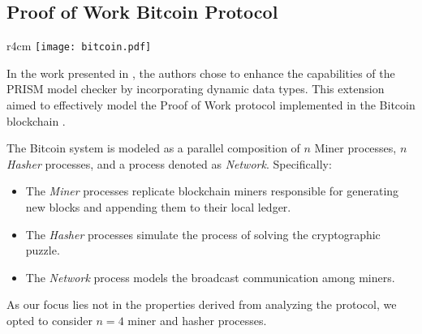 \subsection{Proof of Work Bitcoin Protocol}
\begin{wrapfigure}[11]{r}{4cm}
	\texttt{[image: bitcoin.pdf]}	
\end{wrapfigure} 
In the work presented in \cite{DBLP:journals/concurrency/BistarelliNGLMV23}, the authors chose to enhance the capabilities of the PRISM model checker by incorporating dynamic data types. This extension aimed to effectively model the Proof of Work protocol implemented in the Bitcoin blockchain \cite{bitcoin}.

The Bitcoin system is modeled as a parallel composition of $n$ Miner processes, $n$ \emph{Hasher} processes, and a process denoted as \emph{Network}. Specifically:
\begin{itemize}
\item The \emph{Miner} processes replicate blockchain miners responsible for generating new blocks and appending them to their local ledger.
\item The \emph{Hasher} processes simulate the process of solving the cryptographic puzzle.
\item The \emph{Network} process models the broadcast communication among miners.
\end{itemize}
As our focus lies not in the properties derived from analyzing the protocol, we opted to consider $n=4$ miner and hasher processes. 

